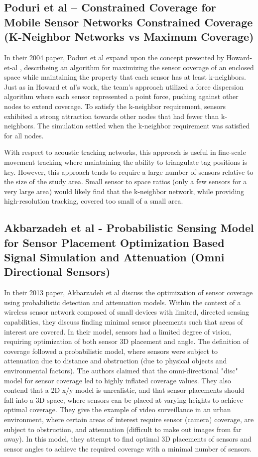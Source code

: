 \subsection{Poduri et al – Constrained Coverage for Mobile Sensor Networks Constrained Coverage (K-Neighbor Networks vs Maximum Coverage)}
In their 2004 paper, Poduri et al\cite{Poduri2004} expand upon the concept presented by Howard-et-al \cite{Howard2002}, describeing an algorithm for maximizing the sensor coverage of an enclosed space while maintaining the property that each sensor has at least k-neighbors. Just as in Howard et al's work, the team's approach utilized a force dispersion algorithm where each sensor represented a point force, pushing against other nodes to extend coverage.  To satisfy the k-neighbor requirement, sensors exhibited a strong attraction towards other nodes that had fewer than k-neighbors.  The simulation settled when the k-neighbor requirement was satisfied for all nodes.  

With respect to acoustic tracking networks, this approach is useful in fine-scale movement tracking where maintaining the ability to triangulate tag positions is key.  However, this approach tends to require a large number of sensors relative to the size of the study area.  Small sensor to space ratios (only a few sensors for a very large area) would likely find that the k-neighbor network, while providing high-resolution tracking, covered too small of a small area.


\subsection{Akbarzadeh et al - Probabilistic Sensing Model for Sensor Placement Optimization Based Signal Simulation and Attenuation (Omni Directional Sensors)}
In their 2013 paper, Akbarzadeh et al\cite{Akbarzadeh2013} discuss the optimization of sensor coverage using probabilistic detection and attenuation models.  Within the context of a wireless sensor network composed of small devices with limited, directed sensing capabilities, they discuss finding minimal sensor placements such that areas of interest are covered.  In their model, sensors had a limited degree of vision, requiring optimization of both sensor 3D placement and angle.  The definition of coverage followed a probabilistic model, where sensors were subject to attenuation due to distance and obstruction (due to physical objects and environmental factors).  The authors claimed that the omni-directional "disc" model for sensor coverage led to highly inflated coverage values.  They also contend that a 2D x/y model is unrealistic, and that sensor placements should fall into a 3D space, where sensors can be placed at varying heights to achieve optimal coverage.  They give the example of video surveillance in an urban environment, where certain areas of interest require sensor (camera) coverage, are subject to obstruction, and attenuation (difficult to make out images from far away).  In this model, they attempt to find optimal 3D placements of sensors and sensor angles to achieve the required coverage with a minimal number of sensors. 

